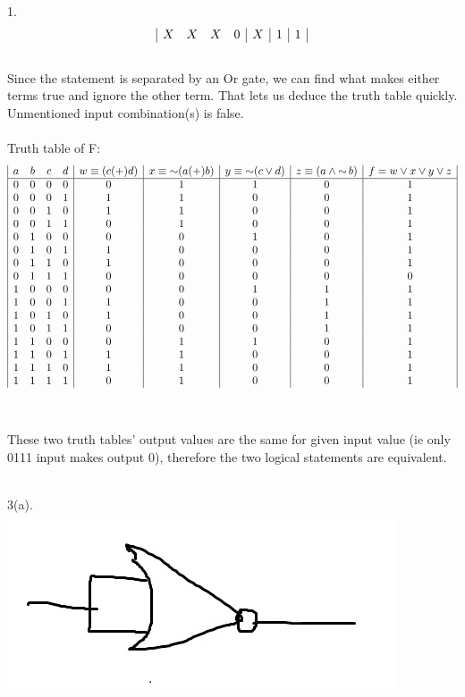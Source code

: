 \documentclass[a4paper, 20pt]{article}
\def\lnot{\mathop{\sim}}
\begin{document}
\begin{question}{1.}
\begin{displaymath}
\begin{array}{|c c c c|c|c|c|}
X&X&X&0&X&1&1\\
\end{array}
\end{displaymath}
\\ Since the statement is separated by an Or gate, we can find what makes either terms true and ignore the other term. That lets us deduce the truth table quickly. Unmentioned input combination(s) is false.
\\
\\ Truth table of F:
\\
\begin{displaymath}
\begin{array}{|c c c c|c|c|c|c|c|}
a & b & c & d & w \equiv (c (+) d) & x \equiv \lnot (a (+) b) & y \equiv \lnot (c \lor d) & z \equiv (a \land \lnot b) & f = w \lor x \lor y \lor z\\
\hline 
0 & 0 & 0 & 0 &0&1&1&0&1\\
0 & 0 & 0 & 1 &1&1&0&0&1\\
0 & 0 & 1 & 0 &1&1&0&0&1\\
0 & 0 & 1 & 1 &0&1&0&0&1\\
0 & 1 & 0 & 0 &0&0&1&0&1\\
0 & 1 & 0 & 1 &1&0&0&0&1\\
0 & 1 & 1 & 0 &1&0&0&0&1\\
0 & 1 & 1 & 1 &0&0&0&0&0\\
1 & 0 & 0 & 0 &0&0&1&1&1\\
1 & 0 & 0 & 1 &1&0&0&1&1\\
1 & 0 & 1 & 0 &1&0&0&1&1\\
1 & 0 & 1 & 1 &0&0&0&1&1\\
1 & 1 & 0 & 0 &0&1&1&0&1\\
1 & 1 & 0 & 1 &1&1&0&0&1\\
1 & 1 & 1 & 0 &1&1&0&0&1\\
1 & 1 & 1 & 1 &0&1&0&0&1\\
\end{array}
\end{displaymath}
\\
\\ These two truth tables' output values are the same for given input value (ie only 0111 input makes output 0), therefore the two logical statements are equivalent.
\newpage

\newpage
\\3(a).
\\
\leavevmode{}\hbox{\includegraphics[scale=0.75]{3a.jpg}}

\end{question}
\end{document}
